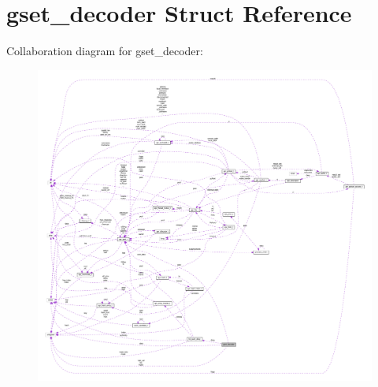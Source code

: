 \hypertarget{structgset__decoder}{}\section{gset\+\_\+decoder Struct Reference}
\label{structgset__decoder}


Collaboration diagram for gset\+\_\+decoder\+:
\nopagebreak
\begin{figure}[H]
\begin{center}
\leavevmode
\includegraphics[width=350pt]{structgset__decoder__coll__graph}
\end{center}
\end{figure}
